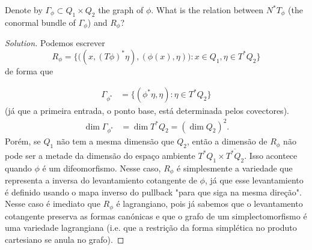 Denote by $\Gamma_\phi\subset Q_1\times Q_2$ the graph of $\phi$. What is the relation between $N^*T_\phi$ (the conormal bundle of $\Gamma_\phi$) and  $R_\phi$?

\begin{proof}[Solution]\leavevmode
	Podemos escrever
	\[R_\phi=\{\big((x,(T\phi)^*\eta),(\phi(x),\eta)\big):x\in Q_1,\eta\in T^*Q_2\}\]
	de forma que 

	\begin{align*}
		\Gamma_{\phi^*}&=\{\left( \phi^*\eta,\eta \right) :\eta\in T^*Q_2\}
	\end{align*}
	(j\'a que a primeira entrada, o ponto base, est\'a determinada pelos covectores).
	\begin{align*}
		\dim \Gamma_{\phi^*}&=\dim T^*Q_2=(\dim Q_2)^2.
	\end{align*}
	Por\'em, se $Q_1$ n\~ao tem a mesma dimens\~ao que $Q_2$, ent\~ao a dimens\~ao de $R_\phi$ n\~ao pode ser a metade da dimens\~ao do espaço ambiente $T^*Q_1\times \overline{T^*Q_2}$. Isso acontece quando $\phi$ \'e um difeomorfismo. Nesse caso, $R_{\phi}$ \'e simplesmente a variedade que representa a inversa do levantamiento cotangente de $\phi$, j\'a que esse levantamiento \'e definido usando o mapa inverso do pullback "para que siga na mesma dire\c c\~ao". Nesse caso \'e imediato que $R_\phi$  \'e lagrangiano, pois j\'a sabemos que o levantamento cotangente preserva as formas can\'onicas e que o grafo de um simplectomorfismo \'e uma variedade lagrangiana (i.e. que a restri\c c\~ao da forma simpl\'etica no produto cartesiano se anula no grafo).
\end{proof}


